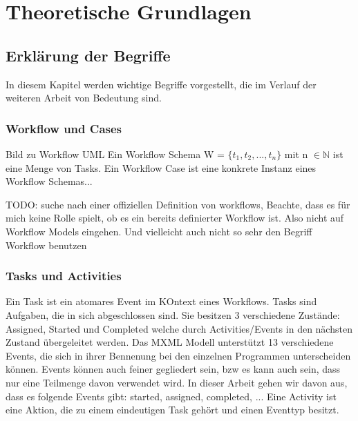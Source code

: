 
\chapter{Theoretische Grundlagen} %

\label{Chapter2} %


\section{Erklärung der Begriffe}
In diesem Kapitel werden wichtige Begriffe vorgestellt, die im Verlauf der weiteren Arbeit von Bedeutung sind.

\subsection{Workflow und Cases}

Bild zu Workflow UML
Ein Workflow Schema W = $\{t_1,t_2,...,t_n\}$ mit n $\in \mathbb{N}$ ist eine Menge von Tasks. Ein Workflow Case ist eine konkrete Instanz eines Workflow Schemas...

TODO: suche nach einer offiziellen Definition von workflows, Beachte, dass es für mich keine Rolle spielt, ob es ein bereits definierter Workflow ist. Also nicht auf Workflow Models eingehen. Und vielleicht auch nicht so sehr den Begriff Workflow benutzen

\subsection{Tasks und Activities}
Ein Task ist ein atomares Event im KOntext eines Workflows.
Tasks sind Aufgaben, die in sich abgeschlossen sind. Sie besitzen 3 verschiedene Zustände: Assigned, Started und Completed welche durch Activities/Events in den nächsten Zustand übergeleitet werden. Das MXML Modell unterstützt 13 verschiedene Events, die sich in ihrer Bennenung bei den einzelnen Programmen unterscheiden können. Events können auch feiner gegliedert sein, bzw es kann auch sein, dass nur eine Teilmenge davon verwendet wird. In dieser Arbeit gehen wir davon aus, dass es folgende Events gibt: started, assigned, completed, ...
Eine Activity ist eine Aktion, die zu einem eindeutigen Task gehört und einen Eventtyp besitzt.

